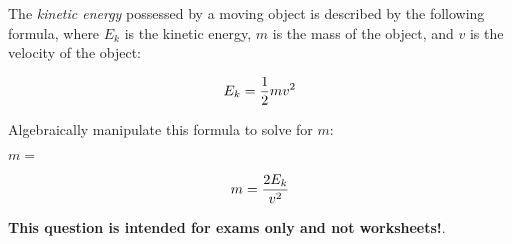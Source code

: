 

The {\it kinetic energy} possessed by a moving object is described by the following formula, where $E_k$ is the kinetic energy, $m$ is the mass of the object, and $v$ is the velocity of the object:

$$E_k = {1 \over 2} m v^2$$

Algebraically manipulate this formula to solve for $m$:

\vskip 20pt

$m = $







$$m = {2 E_k \over v^2}$$







{\bf This question is intended for exams only and not worksheets!}.



